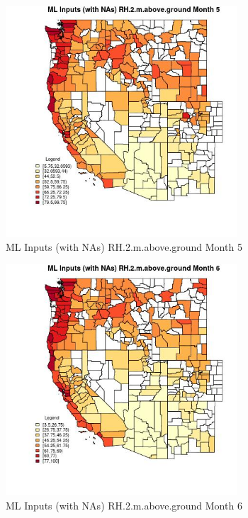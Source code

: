 \begin{figure} 
\centering  
\includegraphics[width=0.77\textwidth]{Code_Outputs/Report_ML_input_PM25_Step4_part_e_de_duplicated_aves_compiled_2019-05-21wNAs_CountyRH2mabovegroundmedianMonth5.jpg} 
\caption{\label{fig:Report_ML_input_PM25_Step4_part_e_de_duplicated_aves_compiled_2019-05-21wNAsCountyRH2mabovegroundmedianMonth5}ML Inputs (with NAs) RH.2.m.above.ground Month 5} 
\end{figure} 
 

\begin{figure} 
\centering  
\includegraphics[width=0.77\textwidth]{Code_Outputs/Report_ML_input_PM25_Step4_part_e_de_duplicated_aves_compiled_2019-05-21wNAs_CountyRH2mabovegroundmedianMonth6.jpg} 
\caption{\label{fig:Report_ML_input_PM25_Step4_part_e_de_duplicated_aves_compiled_2019-05-21wNAsCountyRH2mabovegroundmedianMonth6}ML Inputs (with NAs) RH.2.m.above.ground Month 6} 
\end{figure} 
 


